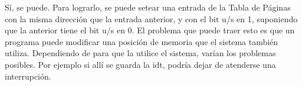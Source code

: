 Sí, se puede. Para lograrlo, se puede setear una entrada de la Tabla de Páginas con la misma dirección que la entrada anterior, y con el bit u/s en 1, suponiendo que la anterior tiene el bit u/s en 0.
El problema que puede traer esto es que un programa puede modificar una posición de memoria que el sistema también utiliza. Dependiendo de para que la utilice el sistema, varían los problemas posibles. Por ejemplo si allí se guarda la idt, podría dejar de atenderse una interrupción.
